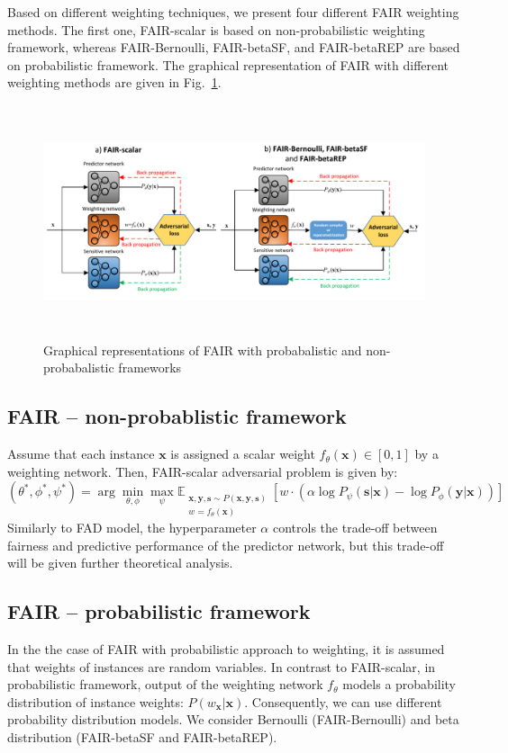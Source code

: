 \documentclass[preprint,12pt]{elsarticle}
\begin{document}
Based on different weighting techniques, we present four different FAIR weighting methods. The first one, FAIR-scalar is based on non-probabilistic weighting framework, whereas FAIR-Bernoulli, FAIR-betaSF, and FAIR-betaREP are based on probabilistic framework. The graphical representation of FAIR with different weighting methods are given in Fig.~\ref{fig:Fig1}.

\begin{figure}[t!]
	\vskip 0.2in
	\center
	\includegraphics[angle=0, width=1\textwidth, height = 2.7in]{Fig1.pdf}
	\captionsetup{justification=centering}
	\caption{Graphical representations of FAIR with probabalistic and non-probabalistic frameworks}
	\label{fig:Fig1}
	\vskip -0.2in
\end{figure}

\subsection{FAIR -- non-probablistic framework}
Assume that each instance $\mathbf{x}$ is assigned a scalar weight $f_\theta(\mathbf{x})\in[0,1]$ by a weighting network. Then, FAIR-scalar adversarial problem is given by:
\begin{equation}
\label{Eq:Loss-scalar}
(\theta^*,\phi^*,\psi^*) = \arg\min_{\theta,\phi}\max_{\psi}\mathbb{E}_{\substack{\mathbf{x},\mathbf{y},\mathbf{s} \sim P(\mathbf{x},\mathbf{y},\mathbf{s})\\w=f_\theta(\mathbf{x})}} [w \cdot(\alpha\log P_{\psi}(\mathbf{s}|\mathbf{x})
- \log P_{\phi}(\mathbf{y}|\mathbf{x}))]
\end{equation}
Similarly to FAD model, the hyperparameter $\alpha$ controls the trade-off between fairness and predictive performance of the predictor network, but this trade-off will be given further theoretical analysis.


\subsection{FAIR -- probabilistic framework}
\label{Sec:FAD-pf}
In the the case of FAIR with probabilistic approach to weighting, it is assumed that  weights of instances are random variables. In contrast to FAIR-scalar, in probabilistic framework, output of the weighting network $f_\theta$ models a probability distribution of instance weights: $P(w_\mathbf{x}|\mathbf{x})$. Consequently, we can use different probability distribution models. We consider Bernoulli (FAIR-Bernoulli) and beta distribution (FAIR-betaSF and FAIR-betaREP).
\end{document}
